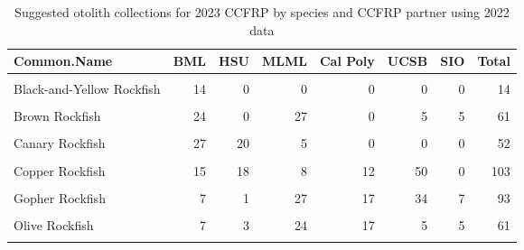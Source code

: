 \documentclass[
]{article}
\begin{document}
\begin{table}

\caption{\label{tab:collections2}Suggested otolith collections for 2023 CCFRP by species and CCFRP partner using 2022 data}
\centering
\begin{tabular}[t]{lrrrrrrr}
\toprule
Common.Name & BML & HSU & MLML & Cal Poly & UCSB & SIO & Total\\
\midrule
\cellcolor{gray!6}{Black Rockfish} & \cellcolor{gray!6}{2} & \cellcolor{gray!6}{15} & \cellcolor{gray!6}{34} & \cellcolor{gray!6}{0} & \cellcolor{gray!6}{0} & \cellcolor{gray!6}{0} & \cellcolor{gray!6}{51}\\
Black-and-Yellow Rockfish & 14 & 0 & 0 & 0 & 0 & 0 & 14\\
\cellcolor{gray!6}{Blue Rockfish} & \cellcolor{gray!6}{10} & \cellcolor{gray!6}{8} & \cellcolor{gray!6}{26} & \cellcolor{gray!6}{7} & \cellcolor{gray!6}{50} & \cellcolor{gray!6}{0} & \cellcolor{gray!6}{101}\\
Brown Rockfish & 24 & 0 & 27 & 0 & 5 & 5 & 61\\
\cellcolor{gray!6}{Calico Rockfish} & \cellcolor{gray!6}{0} & \cellcolor{gray!6}{0} & \cellcolor{gray!6}{0} & \cellcolor{gray!6}{5} & \cellcolor{gray!6}{0} & \cellcolor{gray!6}{19} & \cellcolor{gray!6}{24}\\
\addlinespace
Canary Rockfish & 27 & 20 & 5 & 0 & 0 & 0 & 52\\
\cellcolor{gray!6}{China Rockfish} & \cellcolor{gray!6}{8} & \cellcolor{gray!6}{9} & \cellcolor{gray!6}{34} & \cellcolor{gray!6}{0} & \cellcolor{gray!6}{0} & \cellcolor{gray!6}{0} & \cellcolor{gray!6}{51}\\
Copper Rockfish & 15 & 18 & 8 & 12 & 50 & 0 & 103\\
\cellcolor{gray!6}{Deacon Rockfish} & \cellcolor{gray!6}{39} & \cellcolor{gray!6}{12} & \cellcolor{gray!6}{0} & \cellcolor{gray!6}{0} & \cellcolor{gray!6}{0} & \cellcolor{gray!6}{0} & \cellcolor{gray!6}{51}\\
Gopher Rockfish & 7 & 1 & 27 & 17 & 34 & 7 & 93\\
\addlinespace
\cellcolor{gray!6}{Kelp Rockfish} & \cellcolor{gray!6}{0} & \cellcolor{gray!6}{0} & \cellcolor{gray!6}{12} & \cellcolor{gray!6}{14} & \cellcolor{gray!6}{0} & \cellcolor{gray!6}{4} & \cellcolor{gray!6}{30}\\
Olive Rockfish & 7 & 3 & 24 & 17 & 5 & 5 & 61\\
\cellcolor{gray!6}{Quillback Rockfish} & \cellcolor{gray!6}{7} & \cellcolor{gray!6}{12} & \cellcolor{gray!6}{0} & \cellcolor{gray!6}{0} & \cellcolor{gray!6}{0} & \cellcolor{gray!6}{0} & \cellcolor{gray!6}{19}\\

\end{tabular}
\end{table}
\end{document}
